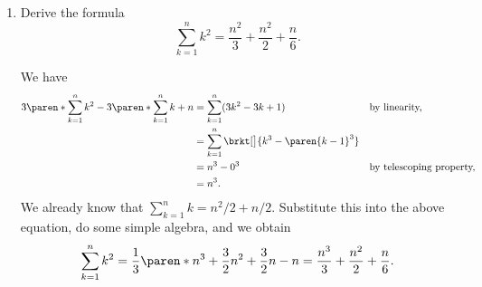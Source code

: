 \documentclass[a4paper]{article}
\begin{document}
\begin{enumerate}
  \begin{proof}
    It's easy to verify that \(2\) is a prime and its only positive
    divisors are \(1\) and \(2\).  Now suppose the above statement holds
    for some \(n > 1\).  We are going to establish that \(n+1\) is either
    a prime or a product of primes.  Suppose \(n+1\) is not a prime.  Then
    by definition and simple reasoning there exist integers \(c\) and
    \(d\) such that \(1 < c, d < n+1\).  Then by the induction hypothesis,
    \(c\) and \(d\) are either a prime or a product of primes, which
    implies \(n+1\) is a product of primes.  Thus, \(n+1\) is either a
    prime or a product of primes (constructive dilemma).
  \end{proof}
  
\item Derive the formula
  \begin{displaymath}
    \sum_{k=1}^n k^2 = \frac{n^2}{3} + \frac{n^2}{2} + \frac{n}{6}.
  \end{displaymath}

  We have
  \begin{align*}
    3 \paren*{\sum_{k=1}^n k^2} - 3 \paren*{\sum_{k=1}^n k}  + n
      &= \sum_{k=1}^n (3k^2 - 3k + 1) && \reason{by linearity,} \\
      &= \sum_{k=1}^n \brkt[\big]{k^3 - \paren{k-1}^3} \\
      &= n^3 - 0^3 && \reason{by telescoping property,} \\
      &= n^3.
  \end{align*}
  We already know that \(\sum_{k=1}^n k = n^2/2 + n/2\).  Substitute this
  into the above equation, do some simple algebra, and we obtain
  \begin{displaymath}
    \sum_{k=1}^n k^2
      = \frac13 \paren*{n^3 + \frac32 n^2 + \frac32 n - n}
      = \frac{n^3}{3} + \frac{n^2}{2} + \frac{n}{6}.
  \end{displaymath}
\end{enumerate}
\end{document}
